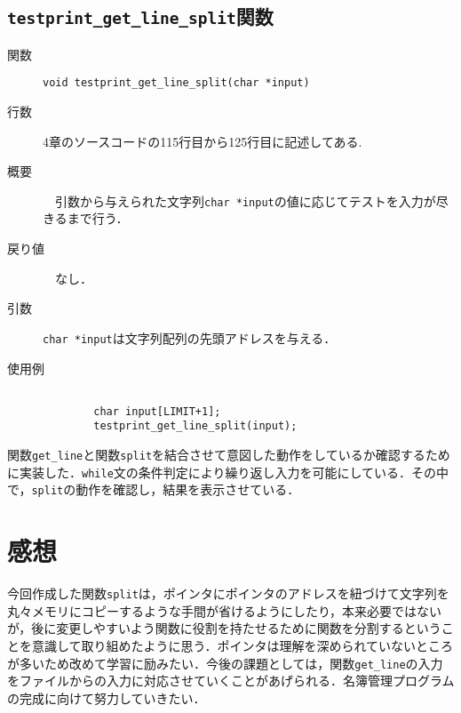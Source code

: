 \documentclass[a4j,11pt]{jarticle}
\begin{document}
\subsection{\texttt{testprint\_get\_line\_split}関数}
 \begin{description}
    \item[関数] \verb|void testprint_get_line_split(char *input)|
    \item[行数]  4章のソースコードの115行目から125行目に記述してある.
    \item[概要]　引数から与えられた文字列\verb|char *input|の値に応じてテストを入力が尽きるまで行う．
    \item[戻り値]　なし． 
    \item[引数]  \verb|char *input|は文字列配列の先頭アドレスを与える．
    \item[使用例]
      \begin{verbatim}

        char input[LIMIT+1];
        testprint_get_line_split(input);
      \end{verbatim}
\end{description}
 関数\verb|get_line|と関数\verb|split|を結合させて意図した動作をしているか確認するために実装した．\verb|while|文の条件判定により繰り返し入力を可能にしている．その中で，\verb|split|の動作を確認し，結果を表示させている．
 \section{感想}
 今回作成した関数\verb|split|は，ポインタにポインタのアドレスを紐づけて文字列を丸々メモリにコピーするような手間が省けるようにしたり，本来必要ではないが，後に変更しやすいよう関数に役割を持たせるために関数を分割するということを意識して取り組めたように思う．ポインタは理解を深められていないところが多いため改めて学習に励みたい．今後の課題としては，関数\verb|get_line|の入力をファイルからの入力に対応させていくことがあげられる．名簿管理プログラムの完成に向けて努力していきたい．
\end{document}
